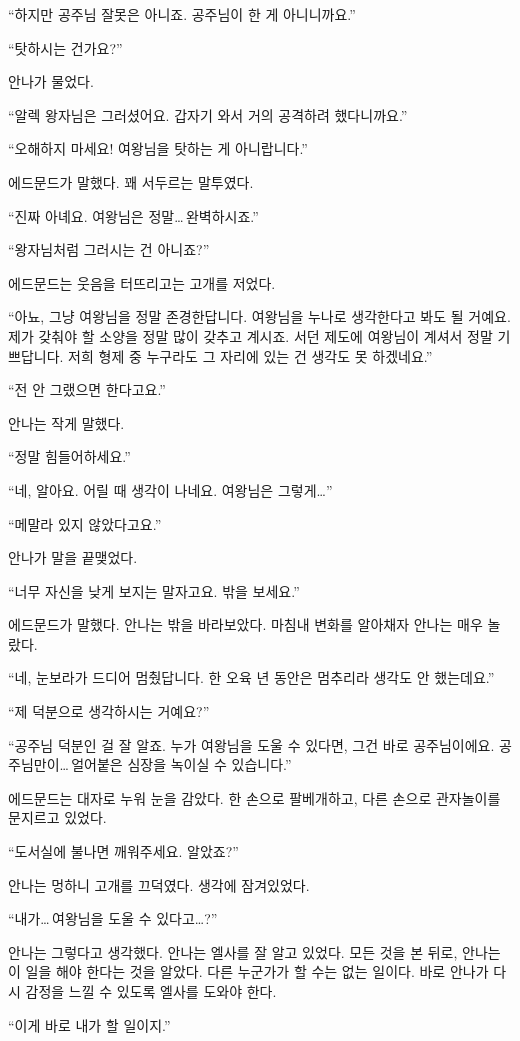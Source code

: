 ``하지만 공주님 잘못은 아니죠. 공주님이 한 게 아니니까요.''

`` 탓하시는 건가요?''

안나가 물었다.

``알렉 왕자님은 그러셨어요. 갑자기 와서 거의 공격하려 했다니까요.''

``오해하지 마세요! 여왕님을 탓하는 게 아니랍니다.''

에드문드가 말했다. 꽤 서두르는 말투였다.

``진짜 아녜요. 여왕님은 정말\ldots\,완벽하시죠.''

`` 왕자님처럼 그러시는 건 아니죠?''

에드문드는 웃음을 터뜨리고는 고개를 저었다.

``아뇨, 그냥 여왕님을 정말 존경한답니다. 여왕님을 누나로 생각한다고 봐도 될 거예요. 제가 갖춰야 할 소양을 정말 많이 갖추고 계시죠. 서던 제도에 여왕님이 계셔서 정말 기쁘답니다. 저희 형제 중 누구라도 그 자리에 있는 건 생각도 못 하겠네요.''

``전 안 그랬으면 한다고요.''

안나는 작게 말했다.

``정말 힘들어하세요.''

``네, 알아요. 어릴 때 생각이 나네요. 여왕님은 그렇게\ldots''

``메말라 있지 않았다고요.''

안나가 말을 끝맺었다.

``너무 자신을 낮게 보지는 말자고요. 밖을 보세요.''

에드문드가 말했다. 안나는 밖을 바라보았다. 마침내 변화를 알아채자 안나는 매우 놀랐다.

``네, 눈보라가 드디어 멈췄답니다. 한 오육 년 동안은 멈추리라 생각도 안 했는데요.''

``제 덕분으로 생각하시는 거예요?''

``공주님 덕분인 걸 잘 알죠. 누가 여왕님을 도울 수 있다면, 그건 바로 공주님이에요. 공주님만이\ldots\,얼어붙은 심장을 녹이실 수 있습니다.''

에드문드는 대자로 누워 눈을 감았다. 한 손으로 팔베개하고, 다른 손으로 관자놀이를 문지르고 있었다.

``도서실에 불나면 깨워주세요. 알았죠?''

안나는 멍하니 고개를 끄덕였다. 생각에 잠겨있었다.

``내가\ldots\,여왕님을 도울 수 있다고\ldots?''

안나는 그렇다고 생각했다. 안나는 엘사를 잘 알고 있었다. 모든 것을 본 뒤로, 안나는 이 일을 해야 한다는 것을 알았다. 다른 누군가가 할 수는 없는 일이다. 바로 안나가 다시 감정을 느낄 수 있도록 엘사를 도와야 한다.

``이게 바로 내가 할 일이지.''


